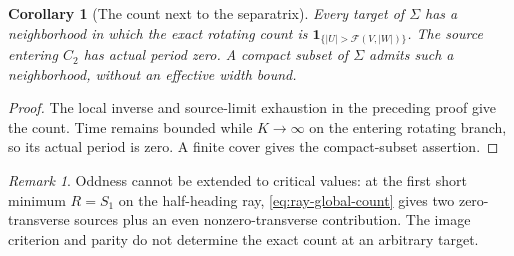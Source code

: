 \documentclass[11pt,a4paper]{article}
\newtheorem{corollary}[theorem]{Corollary}
\theoremstyle{remark}\newtheorem{remark}[theorem]{Remark}
\newcommand{\ind}{\mathbf{1}}
\begin{document}
\begin{corollary}[The count next to the separatrix]
\label{cor:separatrix-collar}
Every target of $\Sigma$ has a neighborhood in which the exact rotating
count is $\ind_{\{|U|>\mathcal F(V,|W|)\}}$. The source entering
$C_2$ has actual period zero. A compact subset of $\Sigma$ admits
such a neighborhood, without an effective width bound.
\end{corollary}
\begin{proof}
The local inverse and source-limit exhaustion in the preceding proof
give the count. Time remains bounded while $K\to\infty$ on the
entering rotating branch, so its actual period is zero. A finite
cover gives the compact-subset assertion.
\end{proof}

\begin{remark}
Oddness cannot be extended to critical values: at the first short minimum
$R=S_1$ on the half-heading ray, \eqref{eq:ray-global-count} gives two
zero-transverse sources plus an even nonzero-transverse contribution.
The image criterion and parity do not determine the exact count at an
arbitrary target.
\end{remark}
\end{document}
